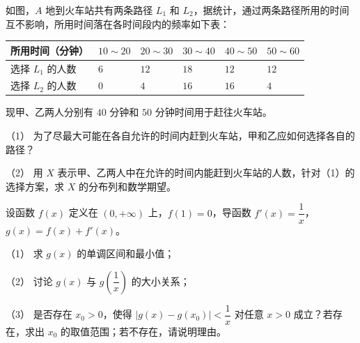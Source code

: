 \begin{question}
如图，$A$ 地到火车站共有两条路径 $L_1$ 和 $L_2$，据统计，通过两条路径所用的时间互不影响，所用时间落在各时间段内的频率如下表：

\begin{center}
\begin{tabular}{llllll}
\toprule
所用时间（分钟） & $10\sim20$ & $20\sim30$ & $30\sim40$ & $40\sim50$ & $50\sim60$ \\
\midrule
选择 $L_1$ 的人数 & $6$ & $12$ & $18$ & $12$ & $12$ \\
选择 $L_2$ 的人数 & $0$ & $4$ & $16$ & $16$ & $4$ \\
\bottomrule
\end{tabular}
\end{center}

现甲、乙两人分别有 $40$ 分钟和 $50$ 分钟时间用于赶往火车站。

（1） 为了尽最大可能在各自允许的时间内赶到火车站，甲和乙应如何选择各自的路径？

（2） 用 $X$ 表示甲、乙两人中在允许的时间内能赶到火车站的人数，针对（1）的选择方案，求 $X$ 的分布列和数学期望。
\nopagebreak[4]
\begin{center}\end{center}
\nopagebreak[4]
\end{question}
\begin{question}
设函数 $f(x)$ 定义在 $(0,+\infty)$ 上，$f(1)=0$，导函数 $f'(x)=\dfrac1x$，$g(x)=f(x)+f'(x)$。

（1） 求 $g(x)$ 的单调区间和最小值；

（2） 讨论 $g(x)$ 与 $g\left(\dfrac1x\right)$ 的大小关系；

（3） 是否存在 $x_0>0$，使得 $|g(x)-g(x_0)|<\dfrac1x$ 对任意 $x>0$ 成立？若存在，求出 $x_0$ 的取值范围；若不存在，请说明理由。

\clearpage

\end{question}